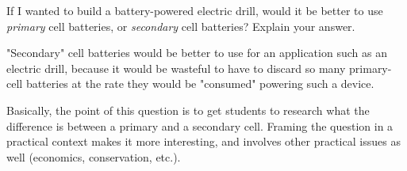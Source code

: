 

If I wanted to build a battery-powered electric drill, would it be better to use {\it primary} cell batteries, or {\it secondary} cell batteries?  Explain your answer.







"Secondary" cell batteries would be better to use for an application such as an electric drill, because it would be wasteful to have to discard so many primary-cell batteries at the rate they would be "consumed" powering such a device.







Basically, the point of this question is to get students to research what the difference is between a primary and a secondary cell.  Framing the question in a practical context makes it more interesting, and involves other practical issues as well (economics, conservation, etc.).




